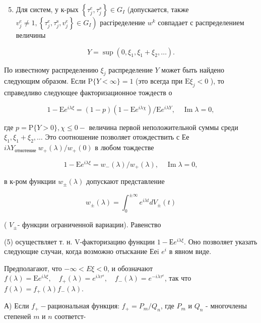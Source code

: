 \documentclass[10pt]{article}
\begin{document}
\begin{enumerate}

  \setcounter{enumi}{4}

  \item Для систем, у к-рых $\left\{\tau_{j}^{e}, \tau_{j}^{s}\right\} \in G_{I}$ (допускается, также $\left.v_{j}^{e} \neq 1,\left\{\tau_{j}^{e}, \tau_{j}^{\mathrm{s}}, v_{j}^{e}\right\} \in G_{I}\right)$ расгіределение $w^{k}$ совпадает с распределением величины

\end{enumerate}



\[

Y=\sup \left(0, \xi_{1}, \xi_{1}+\xi_{2}, \ldots\right) .

\]



По известному распределению $\xi_{j}$ распределение $Y$ может быть найдено следующим образом. Если $\mathrm{P}\{Y<\infty\}=1$ (это всегда при $\mathrm{E} \xi_{j}<0$ ), то справедливо следующее факторизационное тождеств о



\[

1-\mathrm{E} e^{i \lambda \xi}=(1-p)\left(1-\mathrm{E} e^{i \lambda \chi}\right) / \mathrm{E} e^{i \lambda Y}, \quad \operatorname{Im} \lambda=0,

\]



где $p=\mathrm{P}\{Y>0\}, \chi \leqslant 0-$ величина первой неположительной суммы среди $\xi_{1}, \xi_{1}+\xi_{2}, \ldots$ Это соотношение позволяет отождествить с Ее $i \lambda Y_{\text {отнотение }} w_{+}(\lambda) / w_{+}(0)$ в любом тождестве



\[

1-\mathrm{E} e^{i \lambda \xi}=w_{-}(\lambda) / w_{+}(\lambda), \quad \operatorname{Im} \lambda=0,

\]



в к-ром функции $w_{ \pm}(\lambda)$ допускают представление



\[

w_{ \pm}(\lambda)=\int_{0}^{ \pm \infty} e^{i \lambda t} d V_{ \pm}(t)

\]



( $V_{ \pm}$- функции ограниченной вариации). Равенство



(5) осуществляет т. н. V-факторизацию функции $1-Е e^{i \lambda \xi}$. Оно позволяет указать следующие случаи, когда возможно отыскание Ееi $e^{i}$ в явном виде.



Предполагают, что $-\infty<E \xi<0$, и обозначают $f(\lambda)=\mathrm{E} e^{i \lambda \xi}, \quad f_{+}(\lambda)=e^{i \lambda \tau^{s}}, \quad f_{-}(\lambda)=e^{-i \lambda \tau^{e}}$, так что $f(\lambda)=f_{+}(\lambda) f_{-}(\lambda)$.



А) Если $f_{+}-$рациональная функция: $f_{+}=P_{m} / Q_{n}$, где $P_{m}$ и $Q_{n}$ - многочлены степеней $m$ и $n$ соответст-
\end{document}
